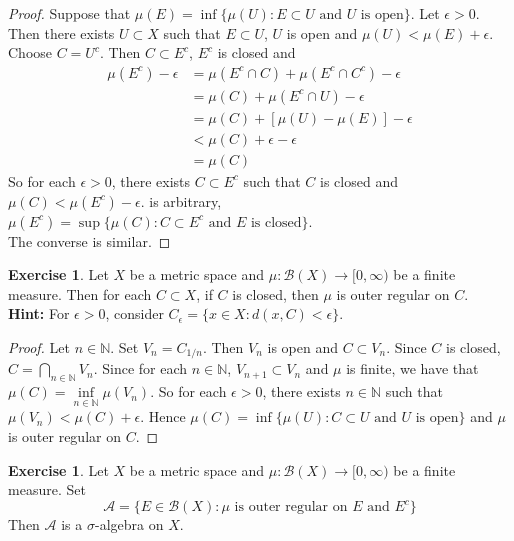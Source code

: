 \documentclass{book}
\theoremstyle{definition}
\newtheorem{ex}[definition]{Exercise}
\newcommand{\ep}{\epsilon}
\newcommand{\sig}{\sigma}
\newcommand{\N}{\mathbb{N}}
\newcommand{\MA}{\mathcal{A}}
\newcommand{\MB}{\mathcal{B}}
\DeclareMathOperator*{\0}{\mbf{0}}
\DeclareMathOperator*{\1}{\mbf{1}}
\newcommand{\Rg}{[0,\infty)}
\begin{document}
	\begin{proof}
		Suppose that $\mu(E) = \inf  \{\mu(U): E \subset U \text{ and $U$ is open} \}$. Let $\ep >0$. Then there exists $U \subset X$ such that $E \subset U$, $U$ is open and $\mu(U) < \mu(E) + \ep$. Choose $C = U^c$. Then $C \subset E^c$, $E^c$ is closed and 
		\begin{align*}
			\mu(E^c) - \ep 
			&= \mu(E^c \cap C) + \mu(E^c \cap C^c) - \ep \\
			&= \mu(C) + \mu(E^c \cap U) - \ep \\
			&= \mu(C) + [\mu(U) - \mu(E)] - \ep \\
			&< \mu(C) + \ep - \ep \\
			&= \mu(C)
		\end{align*}
		So for each $\ep > 0$, there exists $C \subset E^c$ such that $C$ is closed and $\mu(C) < \mu(E^c) - \ep$. is arbitrary, $\mu(E^c) = \sup\{\mu(C): C \subset E^c \text{ and $E$ is closed}\}$. \\
		The converse is similar. 
	\end{proof}

	\begin{ex}
		Let $X$ be a metric space and $\mu: \MB(X) \rightarrow \Rg$ be a finite measure. Then for each $C \subset X$, if $C$ is closed, then $\mu$ is outer regular on $C$. \\
		\textbf{Hint:} For $\ep >0$, consider $C_{\ep} = \{x \in X: d(x, C) < \ep\}$. 
	\end{ex}

	\begin{proof}
		Let $n \in \N$. Set $V_n = C_{1/n}$. Then $V_n$ is open and $C \subset V_n$. Since $C$ is closed, $C = \bigcap_{n \in \N} V_n$. Since for each $n \in \N$, $V_{n+1} \subset V_n$ and $\mu$ is finite, we have that $\mu(C) = \inf\limits_{n \in \N} \mu(V_n)$. So for each $\ep >0$, there exists $n \in \N$ such that $\mu(V_n) < \mu(C) + \ep$. Hence $\mu(C) = \inf \{\mu(U): C \subset U \text{ and $U$ is open} \}$ and $\mu$ is outer regular on $C$.    
	\end{proof}
	
	\begin{ex}
		Let $X$ be a metric space and $\mu: \MB(X) \rightarrow \Rg$ be a finite measure. Set 
		$$\MA = \bigg \{E \in \MB(X): \text{$\mu$ is outer regular on $E$ and $E^c$} \bigg\}$$  
		Then $\MA$ is a $\sig$-algebra on $X$.
	\end{ex}	
\end{document}
